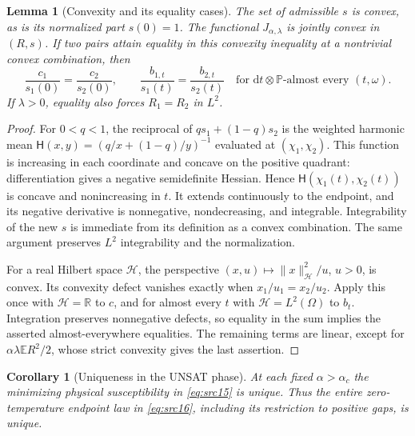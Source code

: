 \documentclass[11pt,a4paper]{article}
\numberwithin{equation}{section}
\newtheorem{lemma}[theorem]{Lemma}
\newtheorem{corollary}[theorem]{Corollary}
\theoremstyle{definition}
\theoremstyle{remark}
\newcommand{\E}{\mathbb E}
\newcommand{\Prob}{\mathbb P}
\newcommand{\R}{\mathbb R}
\newcommand{\dd}{\mathrm d}
\begin{document}
\begin{lemma}[Convexity and its equality cases]\label{crit:convexity}
The set of admissible $s$ is convex, as is its normalized part $s(0)=1$.
The functional $J_{\alpha,\lambda}$ is jointly convex in $(R,s)$.
If two pairs attain equality in this convexity inequality at a nontrivial
convex combination, then
\begin{equation}\label{crit:perspective-equality}
 \frac{c_1}{s_1(0)}=\frac{c_2}{s_2(0)},\qquad
 \frac{b_{1,t}}{s_1(t)}=\frac{b_{2,t}}{s_2(t)}
       \quad\text{for }\dd t\otimes\Prob\text{-almost every }(t,\omega).
\end{equation}
If $\lambda>0$, equality also forces $R_1=R_2$ in $L^2$.
\end{lemma}

\begin{proof}
For $0<q<1$, the reciprocal of $qs_1+(1-q)s_2$ is the weighted harmonic
mean
$\mathsf H(x,y)=(q/x+(1-q)/y)^{-1}$ evaluated at $(\chi_1,\chi_2)$.
This function is increasing in each coordinate and concave on the positive
quadrant: differentiation gives a negative semidefinite Hessian.  Hence
$\mathsf H(\chi_1(t),\chi_2(t))$ is concave and nonincreasing in $t$.
It extends continuously to the endpoint, and its negative derivative is
nonnegative, nondecreasing, and integrable.  Integrability of the new $s$
is immediate from its definition as a convex combination.  The same
argument preserves $L^2$ integrability and the normalization.

For a real Hilbert space $\mathcal H$, the perspective
$(x,u)\mapsto\|x\|_{\mathcal H}^2/u$, $u>0$, is convex.  Its convexity
defect vanishes exactly when $x_1/u_1=x_2/u_2$.  Apply this once with
$\mathcal H=\R$ to $c$, and for almost every $t$ with
$\mathcal H=L^2(\Omega)$ to $b_t$.  Integration preserves nonnegative
defects, so equality in the sum implies the asserted almost-everywhere
equalities.  The remaining terms are linear, except for
$\alpha\lambda\E R^2/2$, whose strict convexity gives the last assertion.
\end{proof}

\begin{corollary}[Uniqueness in the UNSAT phase]\label{crit:unsat-unique}
At each fixed $\alpha>\alpha_c$ the minimizing physical susceptibility in
\eqref{eq:src15} is unique.  Thus the entire zero-temperature endpoint law
in \eqref{eq:src16}, including its restriction to positive gaps, is unique.
\end{corollary}
\end{document}
